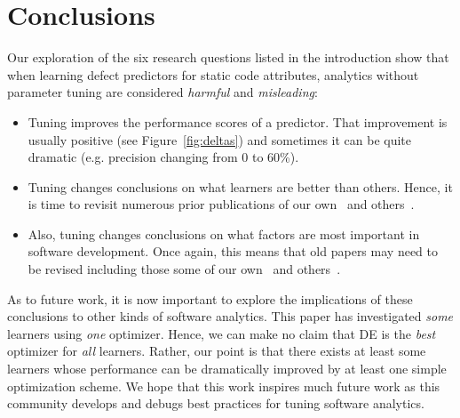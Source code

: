 \documentclass[final,twocolumn,5p]{elsarticle}
\newcommand{\bi}{\begin{itemize}[leftmargin=0.4cm]}
\newcommand{\ei}{\end{itemize}}
\newcommand{\fig}[1]{Figure~\ref{fig:#1}}
\begin{document}







\section{Conclusions}


Our exploration of the six research
questions listed in the introduction
show that when learning defect predictors for static code
attributes,   analytics without parameter tuning are considered {\em harmful} and {\em misleading}:
\bi
\item Tuning improves the performance scores of a predictor.
That improvement is usually positive (see \fig{deltas}) and sometimes
it can be quite   dramatic (e.g. precision changing from 0 to 60\%). \item 
Tuning changes conclusions on what learners are better than others.
Hence, it is time to revisit numerous prior publications of our own~\cite{me07b}
and others~\cite{lessmann2008benchmarking,hall11}.
\item
Also,
tuning changes conclusions on what factors are most important in software development.
Once again, this means that old papers may need to be revised including those
some of our own~\cite{me02k} and others~\cite{bell2013limited,rahman2013how,Moser:2008,zimmermann2007predicting,herzig2013predicting}. 
\ei
As to future work, it is now important
to explore the implications of these
conclusions to other kinds of software analytics.
 This paper has investigated  {\em some} learners using {\em one}  optimizer. Hence, we can make
no claim that DE is the {\em best} optimizer for {\em all} learners.
Rather, our point is that there exists at least some learners
whose performance can be dramatically improved by 
at least one simple optimization scheme.  We hope that this work inspires
much future work as this community develops and debugs best practices for tuning
software analytics.
\end{document}
